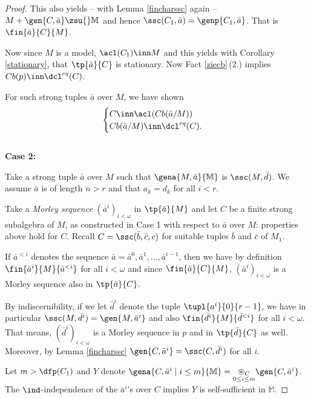 \begin{proof}
This also yields -- with Lemma \ref{fincharssc} again --  $M+\gen{C,\bar a}\zsu{}\mathbb{M}$ and hence $\ssc(C_{1},\bar a)
=\genp{C_{1},\bar a}$. That is $\fin{\bar a}{C}{M}$.

\medskip
Now since $M$ is a model, %
$\acl(C_{1})\inn M$ %
and this yields with Corollary \ref{stationary}, that $\tp{\bar a}{C}$
is stationary. Now Fact \ref{ziecb}\,(2.) implies $Cb(p)\inn\dcl^{eq}(C)$.

For such strong tuples $\bar a$ over $M$, %
we have shown
\begin{gather}\label{cibbi}
\begin{cases}C\inn\acl(Cb(\bar a/M))\\
Cb(\bar a/M)\inn\dcl^{eq}(C).\end{cases}
\end{gather}\\[+1mm]\noindent
{\bf Case 2:}

\medskip
Take a strong tuple $\bar a$ over $M$ such that $\gena{M,\bar a}{\mathbb{M}}$ is $\ssc(M,\bar d)$.
We assume $\bar a$ is of length $n>r$ and that $a_{k}=d_{k}$ for all $i<r$.

Take a {\em Morley sequence} $(\bar a^{i})_{i<\omega}$ in $\tp{\bar a}{M}$ and let $C$ be a finite strong subalgebra of $M$,
as constructed in Case 1 with respect to $\bar a$ over $M$: properties  above hold for $C$. Recall
$C=\ssc(\bar b,\bar c,c)$ for suitable tuples $\bar b$ and $\bar c$ of $M_{1}$.

If $\bar a^{<i}$ denotes the sequence $\bar a=\bar a^{0},\bar a^{1},\dots,\bar a^{i-1}$, then we have by definition
$\fin{\bar a^{i}}{M}{\bar a^{<i}}$ for all $i<\omega$ and since $\fin{\bar a}{C}{M}$, $(\bar a^{i})_{i<\omega}$ is a Morley sequence also in $\tp{\bar a}{C}$.

By indiscernibility, if we let $\bar d^{i}$ denote the tuple $\tupl{a^{i}}{0}{r-1}$, we have in particular $\ssc(M,\bar d^{i})=\gen{M,\bar a^{i}}$
and also $\fin{\bar d^{i}}{M}{\bar d^{<i}}$ for all $i<\omega$. That means, $(\bar d^{i})_{i<\omega}$ is a Morley sequence in $p$ and in $\tp{\bar d}
{C}$ as well.
Moreover, by Lemma \ref{fincharssc} $\gen{C,\bar a^{i}}=\ssc(C,\bar d^{i})$ for all $i$. 

Let $m>\dfp(C_{1})$ and $Y$ denote $\gena{C,\bar a^{i}\mid i\leq m}{\mathbb{M}}=\underset{0\leq i\leq m}{{\circledast_{C}}}\gen{C,\bar a^{i}}$. The $\ind$-independence of the $\bar a^{i}$'s over $C$ implies $Y$ is self-sufficient in $\mathbb{M}$.


\end{proof}
